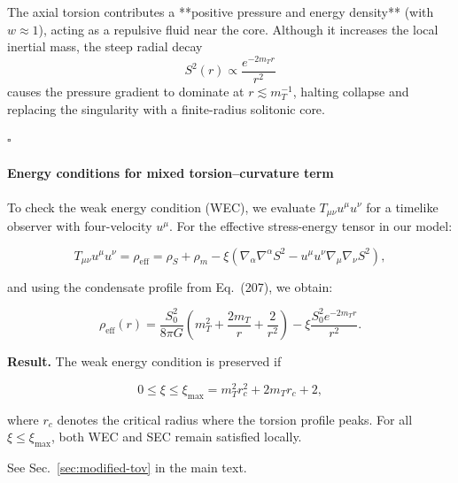 \documentclass{article}
\begin{document}
The axial torsion contributes a **positive pressure and energy density** (with $w \approx 1$), acting as a repulsive fluid near the core. Although it increases the local inertial mass, the steep radial decay
\begin{equation}\label{eq:auto187}
S^2(r) \propto \frac{e^{-2m_T r}}{r^2}
\end{equation}
causes the pressure gradient to dominate at $r \lesssim m_T^{-1}$, halting collapse and replacing the singularity with a finite-radius solitonic core.

\hfill$\square$

\vspace{1.5em}
\paragraph{Energy conditions for mixed torsion–curvature term}

To check the weak energy condition (WEC), we evaluate \( T_{\mu\nu} u^\mu u^\nu \) for a timelike observer with four-velocity \(u^\mu\). For the effective stress-energy tensor in our model:

\begin{equation}
T_{\mu\nu} u^\mu u^\nu = \rho_{\mathrm{eff}} = \rho_S + \rho_m - \xi \left( \nabla_\alpha \nabla^\alpha S^2 - u^\mu u^\nu \nabla_\mu \nabla_\nu S^2 \right),
\tag{208}
\end{equation}

and using the condensate profile from Eq.~(207), we obtain:

\begin{equation}
\rho_{\mathrm{eff}}(r) = \frac{S_0^2}{8\pi G} \left( m_T^2 + \frac{2 m_T}{r} + \frac{2}{r^2} \right) - \xi \frac{S_0^2 e^{-2 m_T r}}{r^2}.
\tag{209}
\end{equation}

\vspace{1ex}
\noindent
\textbf{Result.} The weak energy condition is preserved if

\begin{equation}
0 \leq \xi \leq \xi_{\max} = m_T^2 r_c^2 + 2 m_T r_c + 2,
\tag{210}
\end{equation}

where \(r_c\) denotes the critical radius where the torsion profile peaks. For all \( \xi \le \xi_{\max} \), both WEC and SEC remain satisfied locally.



\label{app:tov-derivation}
See Sec.~\ref{sec:modified-tov} in the main text.
\end{document}
